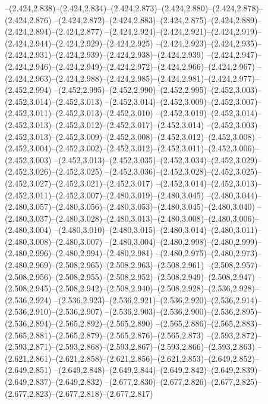   --(2.424,2.838)--(2.424,2.834)--(2.424,2.873)--(2.424,2.880)--(2.424,2.878)--(2.424,2.876)%
  --(2.424,2.872)--(2.424,2.883)--(2.424,2.875)--(2.424,2.889)--(2.424,2.894)--(2.424,2.877)%
  --(2.424,2.924)--(2.424,2.921)--(2.424,2.919)--(2.424,2.944)--(2.424,2.929)--(2.424,2.925)%
  --(2.424,2.923)--(2.424,2.935)--(2.424,2.931)--(2.424,2.939)--(2.424,2.938)--(2.424,2.939)%
  --(2.424,2.947)--(2.424,2.946)--(2.424,2.949)--(2.424,2.972)--(2.424,2.966)--(2.424,2.967)%
  --(2.424,2.963)--(2.424,2.988)--(2.424,2.985)--(2.424,2.981)--(2.424,2.977)--(2.452,2.994)%
  --(2.452,2.995)--(2.452,2.990)--(2.452,2.995)--(2.452,3.003)--(2.452,3.014)--(2.452,3.013)%
  --(2.452,3.014)--(2.452,3.009)--(2.452,3.007)--(2.452,3.011)--(2.452,3.013)--(2.452,3.010)%
  --(2.452,3.019)--(2.452,3.014)--(2.452,3.013)--(2.452,3.012)--(2.452,3.017)--(2.452,3.014)%
  --(2.452,3.003)--(2.452,3.013)--(2.452,3.009)--(2.452,3.008)--(2.452,3.012)--(2.452,3.008)%
  --(2.452,3.004)--(2.452,3.002)--(2.452,3.012)--(2.452,3.011)--(2.452,3.006)--(2.452,3.003)%
  --(2.452,3.013)--(2.452,3.035)--(2.452,3.034)--(2.452,3.029)--(2.452,3.026)--(2.452,3.025)%
  --(2.452,3.036)--(2.452,3.028)--(2.452,3.025)--(2.452,3.027)--(2.452,3.021)--(2.452,3.017)%
  --(2.452,3.014)--(2.452,3.013)--(2.452,3.011)--(2.452,3.007)--(2.480,3.019)--(2.480,3.045)%
  --(2.480,3.044)--(2.480,3.057)--(2.480,3.056)--(2.480,3.053)--(2.480,3.045)--(2.480,3.040)%
  --(2.480,3.037)--(2.480,3.028)--(2.480,3.013)--(2.480,3.008)--(2.480,3.006)--(2.480,3.004)%
  --(2.480,3.010)--(2.480,3.015)--(2.480,3.014)--(2.480,3.011)--(2.480,3.008)--(2.480,3.007)%
  --(2.480,3.004)--(2.480,2.998)--(2.480,2.999)--(2.480,2.996)--(2.480,2.994)--(2.480,2.981)%
  --(2.480,2.975)--(2.480,2.973)--(2.480,2.969)--(2.508,2.965)--(2.508,2.963)--(2.508,2.961)%
  --(2.508,2.957)--(2.508,2.956)--(2.508,2.955)--(2.508,2.952)--(2.508,2.949)--(2.508,2.947)%
  --(2.508,2.945)--(2.508,2.942)--(2.508,2.940)--(2.508,2.928)--(2.536,2.928)--(2.536,2.924)%
  --(2.536,2.923)--(2.536,2.921)--(2.536,2.920)--(2.536,2.914)--(2.536,2.910)--(2.536,2.907)%
  --(2.536,2.903)--(2.536,2.900)--(2.536,2.895)--(2.536,2.894)--(2.565,2.892)--(2.565,2.890)%
  --(2.565,2.886)--(2.565,2.883)--(2.565,2.881)--(2.565,2.879)--(2.565,2.876)--(2.565,2.873)%
  --(2.593,2.872)--(2.593,2.871)--(2.593,2.868)--(2.593,2.867)--(2.593,2.866)--(2.593,2.863)%
  --(2.621,2.861)--(2.621,2.858)--(2.621,2.856)--(2.621,2.853)--(2.649,2.852)--(2.649,2.851)%
  --(2.649,2.848)--(2.649,2.844)--(2.649,2.842)--(2.649,2.839)--(2.649,2.837)--(2.649,2.832)%
  --(2.677,2.830)--(2.677,2.826)--(2.677,2.825)--(2.677,2.823)--(2.677,2.818)--(2.677,2.817)%
